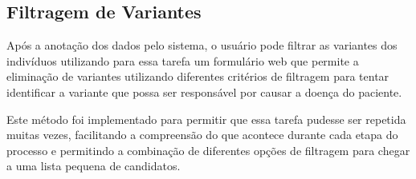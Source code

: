 
\subsection{Filtragem de Variantes}

Após a anotação dos dados pelo sistema, o usuário pode filtrar as variantes dos indivíduos utilizando para essa tarefa um formulário web que permite a eliminação de variantes utilizando diferentes critérios de filtragem para tentar identificar a variante que possa ser responsável por causar a doença do paciente.

Este método foi implementado para permitir que essa tarefa pudesse ser repetida muitas vezes, facilitando a compreensão do que acontece durante cada etapa do processo e permitindo a combinação de diferentes opções de filtragem para chegar a uma lista pequena de candidatos.

